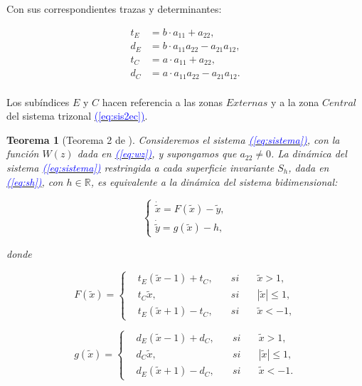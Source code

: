 \documentclass[12pt,a4paper]{report} %
\newtheorem{theorem}{Teorema}[chapter]
\newcommand{\eref}[1]{\hyperref[#1]{\textcolor{blue}{(\ref*{#1})}}}
\newcommand{\eref}[1]{\hyperref[#1]{\textcolor{blue}{\textit{(\ref*{#1})}}}}
\begin{document}
	\noindent Con sus correspondientes trazas y determinantes:
	
	\begin{equation}
		\begin{aligned}
			t_E &= b \cdot a_{11} + a_{22},\\
			d_E &= b \cdot a_{11}a_{22} - a_{21}a_{12},\\
			t_C &= a \cdot a_{11} + a_{22},\\
			d_C &= a \cdot a_{11}a_{22} - a_{21}a_{12}.\\
		\end{aligned}
	\end{equation}\smallskip
	
 \vspace{0.5cm}\noindent Los subíndices $E$ y $C$ hacen referencia a las zonas $Externas$ y a la zona $Central$ del sistema trizonal \eref{eq:sis2ec}.
	
	\vspace{0.5cm}
	
	\begin{theorem}[Teorema 2 de \cite{ponce}]
		Consideremos el sistema \eref{eq:sistema}, con la función $W(z)$ dada en \eref{eq:wz}, y supongamos que $a_{22}\neq 0$. La dinámica del sistema \eref{eq:sistema} restringida a cada superficie invariante $S_h$, dada en \eref{eq:sh}, con $h \in \mathbb{R}$, es equivalente a la dinámica del sistema bidimensional:
		
		\begin{equation}
			\label{eq:sis2ec}
			\left\{
			\begin{gathered}
				\dot{\tilde{x}}=F(\tilde{x})-\tilde{y}, \\[2mm]
				\dot{\tilde{y}}=g(\tilde{x})-h,
			\end{gathered}
			\right.
		\end{equation}
		
		donde
		
		\begin{equation}
			\label{eq:f1}
			F(\tilde{x})=
			\left\{
			\begin{aligned}
				&t_E(\tilde{x}-1)+t_C, \quad &si& \quad \tilde{x}>1,\\
				&t_C\tilde{x}, &si& \quad |\tilde{x}|\leq 1,\\
				&t_E(\tilde{x}+1)-t_C, \quad &si& \quad \tilde{x}<-1,
			\end{aligned}
			\right.
		\end{equation}\smallskip
		
		\begin{equation}
			\label{eq:g1}
			g(\tilde{x})=
			\left\{
			\begin{aligned}
				&d_E(\tilde{x}-1)+d_C, \quad &si& \quad \tilde{x}>1,\\
				&d_C\tilde{x}, &si& \quad |\tilde{x}|\leq 1,\\
				&d_E(\tilde{x}+1)-d_C, \quad &si& \quad \tilde{x}<-1.
			\end{aligned}
			\right.
		\end{equation}\smallskip
		
	\end{theorem}
	
\end{document}
